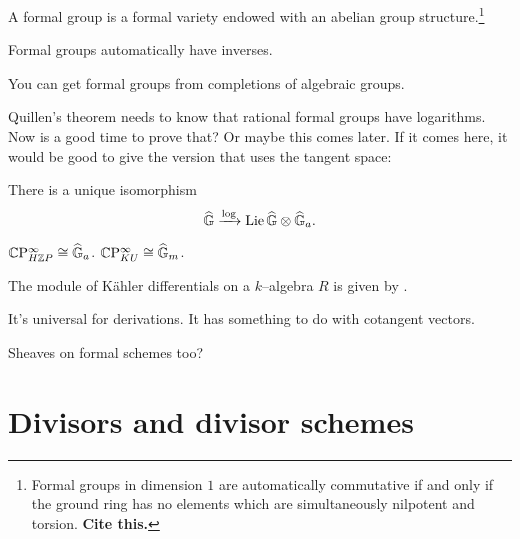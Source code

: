 \begin{definition}
A formal group is a formal variety endowed with an abelian group structure.\footnote{Formal groups in dimension $1$ are automatically commutative if and only if the ground ring has no elements which are simultaneously nilpotent and torsion.  \textbf{Cite this.}}
\end{definition}

\begin{remark}
\end{remark}

\begin{remark}
Formal groups automatically have inverses.
\end{remark}

\begin{remark}
You can get formal groups from completions of algebraic groups.
\end{remark}

Quillen's theorem needs to know that rational formal groups have logarithms.  Now is a good time to prove that?  Or maybe this comes later.  If it comes here, it would be good to give the version that uses the tangent space:
\begin{theorem}
There is a unique isomorphism \[\widehat{\mathbb G} \xrightarrow{\log} \operatorname{Lie} \widehat{\mathbb G} \otimes \widehat{\mathbb G}_a.\]
\end{theorem}

\begin{example}
$\mathbb{C}\mathrm P^\infty_{H\mathbb Z P} \cong \widehat{\mathbb G}_a$.  $\mathbb{C}\mathrm P^\infty_{KU} \cong \widehat{\mathbb G}_m$.
\end{example}

\begin{definition}
The module of K\"ahler differentials on a $k$--algebra $R$ is given by .
\end{definition}

\begin{lemma}
It's universal for derivations.  It has something to do with cotangent vectors.
\end{lemma}

Sheaves on formal schemes too?





\section{Divisors and divisor schemes}

